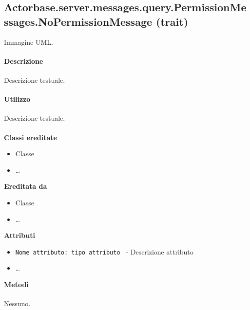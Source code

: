 \documentclass[a4paper]{article}
\begin{document}
\subsection{Actorbase.server.messages.query.PermissionMessages.NoPermissionMessage (trait)}
		Immagine UML.
		\\ \\
		\textbf{Descrizione}
			\\ \\
			Descrizione testuale.
			\\ \\
		\textbf{Utilizzo}
			\\ \\
			Descrizione testuale.
			\\ \\
		\textbf{Classi ereditate}
			\begin{itemize}
				\item Classe
				\item \dots
			\end{itemize}
		\textbf{Ereditata da}
			\begin{itemize}
				\item Classe
				\item \dots
			\end{itemize}
		\textbf{Attributi}
			\begin{itemize}
				\item \texttt{Nome attributo: tipo attributo } - Descrizione attributo
				\item \dots
			\end{itemize}
		\textbf{Metodi}
			\\ \\
			Nessuno.
			
\end{document}

